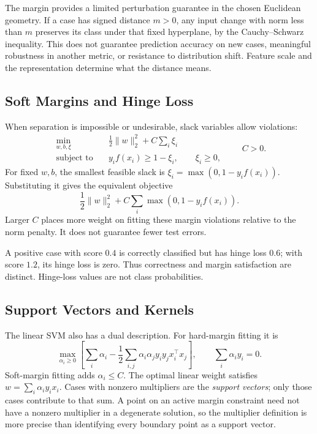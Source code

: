 The margin provides a limited perturbation guarantee in the chosen Euclidean geometry. If a case has signed distance $m>0$, any input change with norm less than $m$ preserves its class under that fixed hyperplane, by the Cauchy--Schwarz inequality. This does not guarantee prediction accuracy on new cases, meaningful robustness in another metric, or resistance to distribution shift. Feature scale and the representation determine what the distance means.

\subsection{Soft Margins and Hinge Loss}

When separation is impossible or undesirable, slack variables allow violations:
\[
\begin{aligned}
\min_{w,b,\xi}\quad&\frac12\|w\|_2^2+C\sum_i\xi_i\\
\text{subject to}\quad&y_i f(x_i)\ge1-\xi_i,\qquad\xi_i\ge0,
\end{aligned}
\qquad C>0.
\]
For fixed $w,b$, the smallest feasible slack is $\xi_i=\max(0,1-y_i f(x_i))$. Substituting it gives the equivalent objective
\[
\frac12\|w\|_2^2+C\sum_i\max(0,1-y_i f(x_i)).
\]
Larger $C$ places more weight on fitting these margin violations relative to the norm penalty. It does not guarantee fewer test errors.

A positive case with score $0.4$ is correctly classified but has hinge loss $0.6$; with score $1.2$, its hinge loss is zero. Thus correctness and margin satisfaction are distinct. Hinge-loss values are not class probabilities.

\subsection{Support Vectors and Kernels}

The linear SVM also has a dual description. For hard-margin fitting it is
\[
\max_{\alpha_i\ge0}\left[
\sum_i\alpha_i-\frac12\sum_{i,j}\alpha_i\alpha_j y_i y_j x_i^\top x_j\right],
\qquad\sum_i\alpha_i y_i=0.
\]
Soft-margin fitting adds $\alpha_i\le C$. The optimal linear weight satisfies $w=\sum_i\alpha_i y_i x_i$. Cases with nonzero multipliers are the \emph{support vectors}; only those cases contribute to that sum. A point on an active margin constraint need not have a nonzero multiplier in a degenerate solution, so the multiplier definition is more precise than identifying every boundary point as a support vector.

